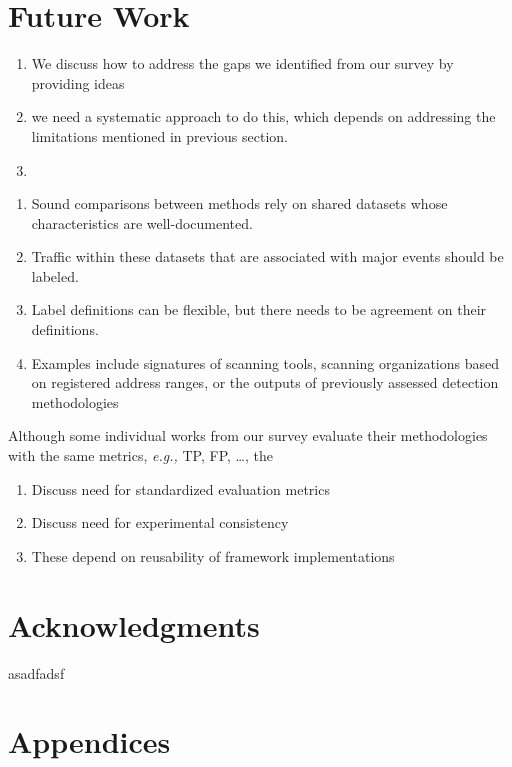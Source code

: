 \documentclass[manuscript,nonacm]{acmart}
\begin{document}
\label{sec:fw}
\section{Future Work}

\begin{enumerate}
    \item We discuss how to address the gaps we identified from our survey by providing ideas 
    \item we need a systematic approach to do this, which depends on addressing the limitations mentioned in previous section.
    \item 
\end{enumerate}

\begin{enumerate}
    \item Sound comparisons between methods rely on shared datasets whose characteristics are well-documented.
    \item Traffic within these datasets that are associated with major events should be labeled.
    \item Label definitions can be flexible, but there needs to be agreement on their definitions.
    \item Examples include signatures of scanning tools, scanning organizations based on registered address ranges, or the outputs of previously assessed detection methodologies
\end{enumerate}


Although some individual works from our survey evaluate their methodologies with the same metrics, \textit{e.g.,} TP, FP, \dots, 
the

\begin{enumerate}
	\item Discuss need for standardized evaluation metrics
	\item Discuss need for experimental consistency
	\item These depend on reusability of framework implementations
\end{enumerate}

\section{Acknowledgments}
asadfadsf

\section{Appendices}
\end{document}

